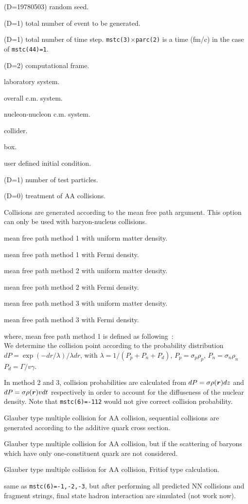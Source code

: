 \documentclass[]{article}
\newenvironment{entry}%
{\begin{list}{}{\setlength{\topsep}{0mm} \setlength{\itemsep}{0mm}
\setlength{\parskip}{0mm} \setlength{\parsep}{0mm}
\setlength{\leftmargin}{20mm} \setlength{\rightmargin}{0mm}
\setlength{\labelwidth}{18mm} \setlength{\labelsep}{2mm}}}%
{\end{list}}
\newenvironment{subentry}%
{\begin{list}{}{\setlength{\topsep}{0mm} \setlength{\itemsep}{0mm}
\setlength{\parskip}{0mm} \setlength{\parsep}{0mm}
\setlength{\leftmargin}{10mm} \setlength{\rightmargin}{0mm}
\setlength{\labelwidth}{18mm} \setlength{\labelsep}{2mm}}}%
{\end{list}}
\newcommand{\ttt}[1]{{\tt#1}}
\newcommand{\itemt}[1]{\item[{\tt #1}\hfill]}
\newcommand{\bold}[1]{\mbox{\boldmath $#1$}}    %
\newcommand{\rr}{{\bold{r}}}
\begin{document}
\begin{entry}
\itemt{mstc(1) :} (D=19780503) random seed.
\itemt{mstc(2) :} (D=1) total number of event to be generated.
\itemt{mstc(3) :} (D=1) total number of time step.
           \ttt{mstc(3)$\times$parc(2)} is a time (fm/c) in the case of
          \ttt{mstc(44)=1}.
\itemt{mstc(4) :} (D=2) computational frame.
 \begin{subentry}
        \itemt{$=0$:} laboratory system.
        \itemt{$=1$:} overall c.m. system.
        \itemt{$=2$:} nucleon-nucleon c.m. system.
        \itemt{$=3$:} collider.
       \itemt{$=10$:} box.
       \itemt{$=100$:} user defined initial condition.
 \end{subentry}
\itemt{mstc(5) :} (D=1) number of test particles.
\itemt{mstc(6) :} (D=0) treatment of AA collisions.
   \begin{subentry}
      \itemt{$<-101$ :} Collisions are generated according to the 
                     mean free path argument. This option can only
                     be used with baryon-nucleus collisions.
      \itemt{$=-111$ :} mean free path method 1 with uniform matter density.
      \itemt{$=-112$ :} mean free path method 1 with Fermi density.
      \itemt{$=-121$ :} mean free path method 2 with uniform matter density.
      \itemt{$=-122$ :} mean free path method 2 with Fermi density.
      \itemt{$=-131$ :} mean free path method 3 with uniform matter density.
      \itemt{$=-132$ :} mean free path method 3 with Fermi density.

       where, mean free path method 1 is defined as following~\cite{KK}:\\
       We determine the collision point according to the probability
       distribution $dP=\exp(-dr/\lambda)/\lambda dr$,
       with $\lambda=1/(P_p+P_n+P_d)$,
       $P_p=\sigma_p\rho_p$, $P_n=\sigma_n\rho_n$
       $P_d=\Gamma/v\gamma$.

       In method 2 and 3, collision probabilities are
       calculated from 
       $dP=\sigma \rho(\rr)dz$ and $dP=\sigma \rho(\rr)v dt$ respectively
       in order to account for the diffuseness of the nuclear density.
       Note that \ttt{mstc(6)=-112} would not give correct collision
       probability.


      \itemt{$=-3$ :} Glauber type multiple collision for AA collision,
                      sequential collisions are generated according to
                      the additive quark cross section.
      \itemt{$=-2$ :} Glauber type multiple collision for AA collision,
                      but if the scattering of baryons
                      which have only one-constituent quark are not 
                      considered.
      \itemt{$=-1$ :} Glauber type multiple collision for AA collision,
                      Fritiof type calculation.
      \itemt{$=-21,-22,-23$ :} same as \ttt{mstc(6)=-1,-2,-3},
      but after performing
       all predicted NN collisions and fragment strings,
       final state hadron interaction are simulated (not work now).


\end{subentry}
\end{entry}
\end{document}
